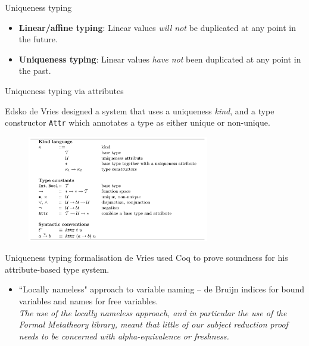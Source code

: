 \documentclass[10pt]{beamer}
\begin{document}
\begin{frame}{Uniqueness typing}

\begin{itemize}
\item \textbf{Linear/affine typing}: Linear values \textit{will not} be duplicated at any point in the future.
\item \textbf{Uniqueness typing}: Linear values \textit{have not} been duplicated at any point in the past.
\end{itemize}

\end{frame}

\begin{frame}{Uniqueness typing via attributes}

Edsko de Vries designed a system that uses a uniqueness \textit{kind}, and a type constructor \texttt{Attr} which annotates a type as either unique or non-unique.

\begin{figure}[h]
\centering
\includegraphics[width=300px]{de_Vries_attributes.png}
\label{}
\end{figure}
\end{frame}

\begin{frame}{Uniqueness typing formalisation}
de Vries used Coq to prove soundness for his attribute-based type system.

\begin{itemize}
\item ``Locally nameless" approach to variable naming -- de Bruijn indices for bound variables and names for free variables.\\

\textit{The use of the locally nameless approach, and in particular the use of the Formal Metatheory library, meant that little of our subject reduction
proof needs to be concerned with alpha-equivalence or freshness.}

\end{itemize}
\end{frame}
\end{document}
